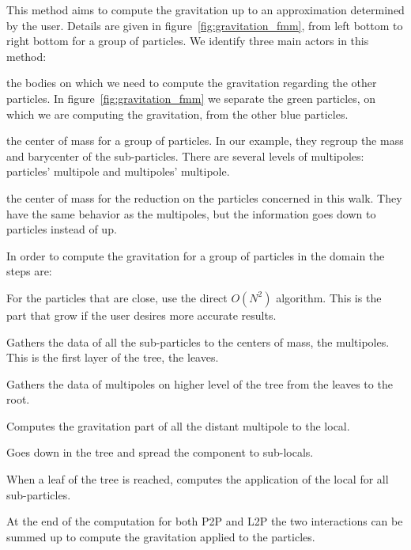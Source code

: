 This method aims to compute the gravitation up to an approximation determined by the user. 
Details are given in figure~\ref{fig:gravitation_fmm}, from left bottom to right bottom for a group of particles.
We identify three main actors in this method: \\

\begin{description}
\item[Particles: ] the bodies on which we need to compute the gravitation regarding the other particles. 
In figure~\ref{fig:gravitation_fmm} we separate the green particles, on which we are computing the gravitation, from the other blue particles. 
\item[Multipoles: ] the center of mass for a group of particles.
In our example, they regroup the mass and barycenter of the sub-particles. 
There are several levels of multipoles: particles' multipole and multipoles' multipole.
\item[Locals: ] the center of mass for the reduction on the particles concerned in this walk. 
They have the same behavior as the multipoles, but the information goes down to particles instead of up.\\ 
\end{description}

In order to compute the gravitation for a group of particles in the domain the steps are: \\

\begin{description}
	\item[Particles to Particles (P2P): ] For the particles that are close, use the direct $O(N^2)$ algorithm.  
	This is the part that grow if the user desires more accurate results. 
	\item[Particles to Multipoles (P2M): ] Gathers the data of all the sub-particles to the centers of mass, the multipoles.
	This is the first layer of the tree, the leaves. 
	\item[Multipoles to Multipoles (M2M): ] Gathers the data of multipoles on higher level of the tree from the leaves to the root. 
	\item[Multipoles to Local (M2L): ] Computes the gravitation part of all the distant multipole to the local. 
	\item[Local to Local (L2L): ] Goes down in the tree and spread the component to sub-locals.
	\item[Local to Particles (L2P): ] When a leaf of the tree is reached, computes the application of the local for all sub-particles. 
	\item[Summation: ] At the end of the computation for both P2P and L2P the two interactions can be summed up to compute the gravitation applied to the particles. \\
\end{description}

